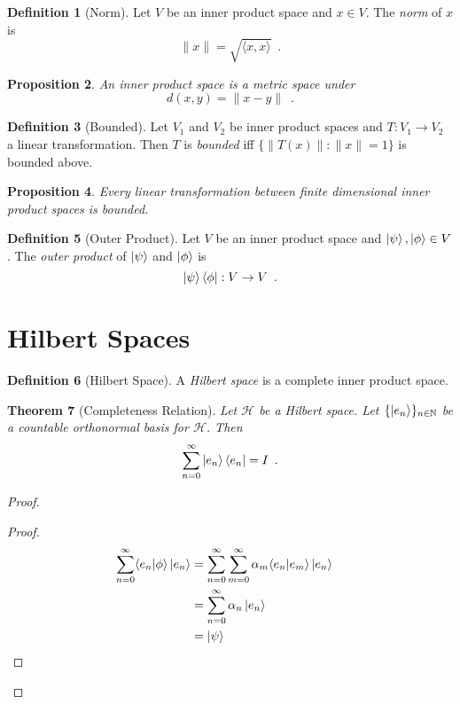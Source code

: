 \documentclass{book}
\let\qed\relax
\newtheorem{prop}{Proposition}[chapter]
\newtheorem{thm}[prop]{Theorem}
\theoremstyle{definition}
\newtheorem{df}[prop]{Definition}
\begin{document}
\begin{df}[Norm]
Let $V$ be an inner product space and $x \in V$. The \emph{norm} of $x$ is
\[ \| x \| = \sqrt{\langle x,x \rangle} \enspace . \]
\end{df}

\begin{prop}
An inner product space is a metric space under
\[ d(x,y) = \| x-y \| \enspace . \]
\end{prop}


\begin{df}[Bounded]
Let $V_1$ and $V_2$ be inner product spaces and $T : V_1 \rightarrow V_2$ a linear transformation. Then $T$ is \emph{bounded} iff $\{ \| T(x) \| : \|x \| = 1 \}$ is bounded above.
\end{df}

\begin{prop}
Every linear transformation between finite dimensional inner product spaces is bounded.
\end{prop}


\begin{df}[Outer Product]
Let $V$ be an inner product space and $\left| {\psi} \right\rangle, \left| {\phi} \right\rangle \in V$. The \emph{outer product} of $\left| {\psi} \right\rangle$ and $\left| {\phi} \right\rangle$ is
\[ \left| {\psi} \right\rangle \left\langle {\phi} \right| : V \rightarrow V \enspace . \]
\end{df}

\section{Hilbert Spaces}

\begin{df}[Hilbert Space]
A \emph{Hilbert space} is a complete inner product space.
\end{df}

\begin{thm}[Completeness Relation]
Let $\mathcal{H}$ be a Hilbert space. Let $\{ \left| {e_n} \right\rangle \}_{n \in \mathbb{N}}$ be a countable orthonormal basis for $\mathcal{H}$. Then
\[ \sum_{n=0}^\infty \left| {e_n} \right\rangle \left\langle {e_n} \right| = I \enspace . \]
\end{thm}

\begin{proof}
\pf
{}
\begin{proof}
	\pf
	\begin{align*}
		\sum_{n=0}^\infty \langle e_n | \phi \rangle \ket{e_n} & = \sum_{n=0}^\infty \sum_{m=0}^\infty \alpha_m \langle e_n | e_m \rangle \ket{e_n} \\
		& = \sum_{n=0}^\infty \alpha_n \ket{e_n} \\
		& = \ket{\psi} & \qed
	\end{align*}
\end{proof}
\qed
\end{proof}
\end{document}
